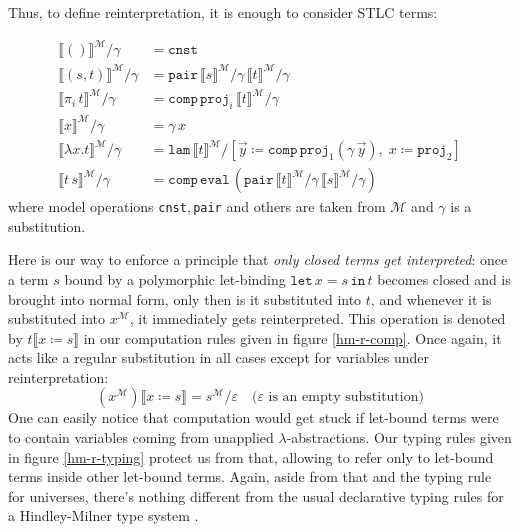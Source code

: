 Thus, to define reinterpretation, it is enough
to consider STLC terms:

\begin{definition}
    \begin{align}{}
        \llbracket()\rrbracket^\mathcal{M}/\gamma &=
            \mathtt{cnst}
        \\
        \llbracket(s,t)\rrbracket^\mathcal{M}/\gamma &=
            \mathtt{pair}
                \,\llbracket s\rrbracket^\mathcal{M}/
                    \gamma
                \,\llbracket t\rrbracket^\mathcal{M}/
                    \gamma
        \\
        \llbracket\pi_i\,t\rrbracket^\mathcal{M}/\gamma
            &=\mathtt{comp}\,\mathtt{proj}_i\,\llbracket
                t\rrbracket^\mathcal{M}/\gamma
        \\
        \llbracket x\rrbracket^\mathcal{M}/\gamma &=
            \gamma\,x
        \\
        \llbracket\lambda x.t\rrbracket^\mathcal{M}/
            \gamma &= \mathtt{lam}\,\llbracket t
            \rrbracket^\mathcal{M}/\left[
                \vec{y}\coloneqq\mathtt{comp}\,
                    \mathtt{proj}_1(\gamma\,\vec{y}),\;
                x\coloneqq\mathtt{proj}_2
            \right]
        \\
        \llbracket t\,s\rrbracket^\mathcal{M}/\gamma &=
            \mathtt{comp}\,\mathtt{eval}\,\left(
                \mathtt{pair}
                \,\llbracket t\rrbracket^\mathcal{M}/
                    \gamma
                \,\llbracket s\rrbracket^\mathcal{M}/
                    \gamma
            \right)
    \end{align}
    where model operations \texttt{cnst},\,\texttt{pair}
    and others are taken from $\mathcal{M}$ and
    $\gamma$ is a substitution.
\end{definition}

Here is our way to enforce a principle that \textit{only
closed terms get interpreted}: once a term $s$ bound by
a polymorphic let-binding
$\mathtt{let}\,x=s\,\mathtt{in}\,t$ becomes closed and
is brought into normal form, only then is it
substituted into $t$, and whenever it is substituted
into $x^\mathcal{M}$, it immediately gets
reinterpreted. This operation is denoted by
$t\llbracket x\coloneqq s\rrbracket$ in our computation
rules given in figure \ref{hm-r-comp}. Once again, it
acts like a regular substitution in all cases except for
variables under reinterpretation:
\[
    \left(x^\mathcal{M}\right)\llbracket x\coloneqq s
    \rrbracket = s^\mathcal{M}/\varepsilon
    \quad\text{($\varepsilon$ is an empty substitution)}
\]
One can easily notice that computation would get stuck
if let-bound terms were to contain variables coming
from unapplied $\lambda$-abstractions. Our typing rules
given in figure \ref{hm-r-typing} protect us from that,
allowing to refer only to let-bound terms inside other
let-bound terms. Again, aside from that and the typing rule
for universes, there's nothing different from the usual
declarative typing rules for a Hindley-Milner type
system \cite{Clement:ML1986}.

